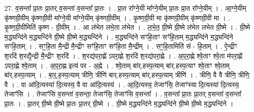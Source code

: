 \documentclass[17pt]{extarticle}
\begin{document}
27. व॒सन्ता᳚ प्रा॒तः प्रा॒तर् व॒सन्ता॑ व॒सन्ता᳚ प्रा॒तः । . प्रा॒त रा᳚ग्ने॒यी मा᳚ग्ने॒यीम् प्रा॒तः प्रा॒त रा᳚ग्ने॒यीम् । . आ॒ग्ने॒यीम् कृ॑ष्णग्री॒वीम् कृ॑ष्णग्री॒वी मा᳚ग्ने॒यी मा᳚ग्ने॒यीम् कृ॑ष्णग्री॒वीम् । . कृ॒ष्ण॒ग्री॒वी मा कृ॑ष्णग्री॒वीम् कृ॑ष्णग्री॒वी मा । . कृ॒ष्ण॒ग्री॒वीमिति॑ कृष्ण - ग्री॒वीम् । . आ ल॑भेत लभे॒ता ल॑भेत । . ल॒भे॒त॒ ग्री॒ष्मे ग्री॒ष्मे ल॑भेत लभेत ग्री॒ष्मे । . ग्री॒ष्मे म॒द्ध्यन्दि॑ने म॒द्ध्यन्दि॑ने ग्री॒ष्मे ग्री॒ष्मे म॒द्ध्यन्दि॑ने । . म॒द्ध्यन्दि॑ने सꣳहि॒ताꣳ सꣳ॑हि॒ताम् म॒द्ध्यन्दि॑ने म॒द्ध्यन्दि॑ने सꣳहि॒ताम् । . सꣳ॒॒हि॒ता मै॒न्द्री मै॒न्द्रीꣳ सꣳ॑हि॒ताꣳ सꣳ॑हि॒ता मै॒न्द्रीम् । . सꣳ॒॒हि॒तामिति॑ सं - हि॒ताम् । . ऐ॒न्द्रीꣳ श॒रदि॑ श॒रद्यै॒न्द्री मै॒न्द्रीꣳ श॒रदि॑ । . श॒रद्य॑परा॒ह्णे॑ ऽपरा॒ह्णे श॒रदि॑ श॒रद्य॑परा॒ह्णे । . अ॒प॒रा॒ह्णे श्वे॒ताꣳ श्वे॒ता म॑परा॒ह्णे॑ ऽपरा॒ह्णे श्वे॒ताम् । . अ॒प॒रा॒ह्ण इत्य॑ पर - अ॒ह्ने । . श्वे॒ताम् बा॑र्.हस्प॒त्याम् बा॑र्.हस्प॒त्याꣳ श्वे॒ताꣳ श्वे॒ताम् बा॑र्.हस्प॒त्याम् । . बा॒र्॒.ह॒स्प॒त्याम् त्रीणि॒ त्रीणि॑ बार्.हस्प॒त्याम् बा॑र्.हस्प॒त्याम् त्रीणि॑ । . त्रीणि॒ वै वै त्रीणि॒ त्रीणि॒ वै । . वा आ॑दि॒त्यस्या॑ दि॒त्यस्य॒ वै वा आ॑दि॒त्यस्य॑ । . आ॒दि॒त्यस्य॒ तेजाꣳ॑सि॒ तेजाꣳ॑स्या दि॒त्यस्या॑ दि॒त्यस्य॒ तेजाꣳ॑सि । . तेजाꣳ॑सि व॒सन्ता॑ व॒सन्ता॒ तेजाꣳ॑सि॒ तेजाꣳ॑सि व॒सन्ता᳚ । . व॒सन्ता᳚ प्रा॒तः प्रा॒तर् व॒सन्ता॑ व॒सन्ता᳚ प्रा॒तः । . प्रा॒तर् ग्री॒ष्मे ग्री॒ष्मे प्रा॒तः प्रा॒तर् ग्री॒ष्मे । . ग्री॒ष्मे म॒द्ध्यन्दि॑ने म॒द्ध्यन्दि॑ने ग्री॒ष्मे ग्री॒ष्मे म॒द्ध्यन्दि॑ने । \newline
\end{document}
